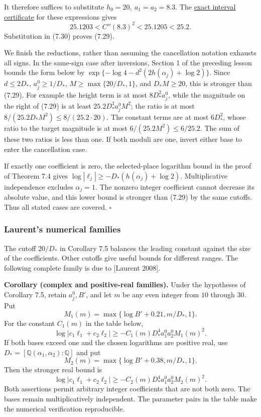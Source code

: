 \documentclass[
  11pt,
  a4paper,
]{article}
\begin{document}
It therefore suffices to substitute \(h_0=20,\ a_1=a_2=8.3\). The
\href{https://kokunoyumeto.github.io/open-math-courses-public/courses/TR-BAKER/verification/laurent_constant.py}{exact interval certificate}
for these expressions gives \[
25.1203<C''(8.3)^2<25.1205<25.2.
\] Substitution in (7.30) proves (7.29).

We finish the reductions, rather than assuming the cancellation notation
exhausts all signs. In the same-sign case after inversions, Section 1 of
the preceding lesson bounds the form below by
\(\exp\{-\log4-d^2(2h(\alpha_j)+\log2)\}\). Since \(d\le2D_*\),
\(a_j^0\ge1/D_*\), \(M\ge\max\{20/D_*,1\}\), and \(D_*M\ge20\), this is
stronger than (7.29). For example the height term is at most
\(8D_*^2a_j^0\), while the magnitude on the right of (7.29) is at least
\(25.2D_*^3a_j^0M^2\); the ratio is at most
\(8/(25.2D_*M^2)\le8/(25.2\cdot20)\). The constant terms are at most
\(6D_*^2\), whose ratio to the target magnitude is at most
\(6/(25.2M^2)\le6/25.2\). The sum of these two ratios is less than one.
If both moduli are one, invert either base to enter the cancellation
case.

If exactly one coefficient is zero, the selected-place logarithm bound
in the proof of Theorem 7.4 gives
\(\log|\ell_j|\ge-D_*(h(\alpha_j)+\log2)\). Multiplicative independence
excludes \(\alpha_j=1\). The nonzero integer coefficient cannot decrease
its absolute value, and this lower bound is stronger than (7.29) by the
same cutoffs. Thus all stated cases are covered. \(\square\)

\subsubsection{Laurent's numerical
families}\label{laurents-numerical-families}

The cutoff \(20/D_*\) in Corollary 7.5 balances the leading constant
against the size of the coefficients. Other cutoffs give useful bounds
for different ranges. The following complete family is due to {[}Laurent
2008{]}.

\textbf{Corollary (complex and positive-real families).} Under the
hypotheses of Corollary 7.5, retain \(a_j^0,B'\), and let \(m\) be any
even integer from \(10\) through \(30\). Put \[
M_1(m)=\max\{\log B'+0.21,m/D_*,1\}.
\] For the constant \(C_1(m)\) in the table below, \[
\log|c_1\ell_1+c_2\ell_2|
\ge-C_1(m)D_*^4a_1^0a_2^0M_1(m)^2.
\] If both bases exceed one and the chosen logarithms are positive real,
use \(D_*=[\mathbb Q(\alpha_1,\alpha_2):\mathbb Q]\) and put \[
M_2(m)=\max\{\log B'+0.38,m/D_*,1\}.
\] Then the stronger real bound is \[
\log|c_1\ell_1+c_2\ell_2|
\ge-C_2(m)D_*^4a_1^0a_2^0M_2(m)^2.
\] Both assertions permit arbitrary integer coefficients that are not
both zero. The bases remain multiplicatively independent. The parameter
pairs in the table make the numerical verification reproducible.
\end{document}
